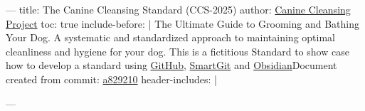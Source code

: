 ---
title: The Canine Cleansing Standard (CCS-2025)
author: \href{https://github.com/danielsiegl/CanineCleansingStandard}{Canine Cleansing Project}
toc: true
include-before: |
   The Ultimate Guide to Grooming and Bathing Your Dog. A systematic and standardized approach to maintaining optimal cleanliness and hygiene for your dog.\newline
   This is a fictitious Standard to show case how to develop a standard using \href{https://github.com/danielsiegl/CanineCleansingStandard}{GitHub}, \href{https://www.syntevo.com/smartgit/)}{SmartGit} and \href{https://obsidian.md/}{Obsidian}\newline\newline Document created from commit: \href{https://github.com/danielsiegl/CanineCleansingStandard/commit/a829210}{a829210}\newpage
header-includes: |
   \usepackage{fancyhdr}
   \usepackage[colorlinks=true, urlcolor=blue, linkcolor=green]{hyperref}
   \pagestyle{fancy}
   \fancyhf{}
   \fancyfoot[R]{\newline{\thepage}}
---
\newpage